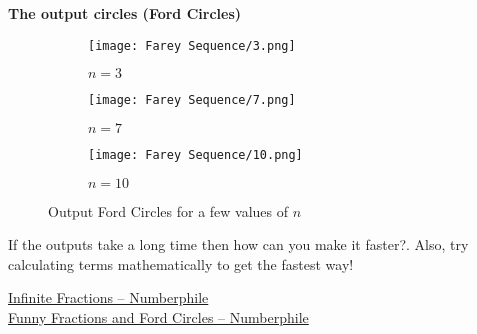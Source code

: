 \documentclass[../../Problems]{subfiles}
\begin{document}
\textbf{The output circles (Ford Circles)}
\begin{figure}[H]
	\centering
	\begin{subfigure}{0.3\linewidth}
		\texttt{[image: Farey Sequence/3.png]}
		\caption{$n=3$}
	\end{subfigure}
	\begin{subfigure}{0.3\linewidth}
		\texttt{[image: Farey Sequence/7.png]}
		\caption{$n=7$}
	\end{subfigure}
	\begin{subfigure}{0.3\linewidth}
		\texttt{[image: Farey Sequence/10.png]}
		\caption{$n=10$}
	\end{subfigure}
	\caption{Output Ford Circles for a few values of $n$}
\end{figure}
\begin{noteI}
	If the outputs take a long time then how can you make it faster?. Also, try calculating terms mathematically to get the fastest way!
\end{noteI}
\begin{funvideo}
\href{https://youtu.be/DpwUVExX27E}{Infinite Fractions -- Numberphile}\\
\href{https://youtu.be/0hlvhQZIOQw}{Funny Fractions and Ford Circles -- Numberphile}
\end{funvideo}
\recalctypearea
\end{document}
